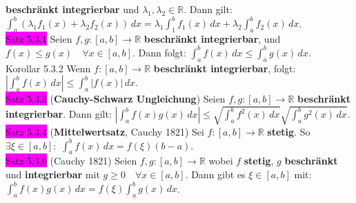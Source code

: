 \documentclass[landscape, 10pt]{article}
\newcommand{\R}{\mathbb{R}}
\begin{document}
\begin{multicols}{3}
                     \textbf{beschränkt 
                     integrierbar} und \textcolor{NavyBlue}{$\lambda_1,\lambda_2\in\R$}. 
                     Dann gilt: 
                     \textcolor{NavyBlue}{
                     $\int_a^b(\lambda_1f_1(x)+\lambda_2f_2(x))\,dx
                     =\lambda_1\int_1^bf_1(x)\,dx+\lambda_2\int_a^bf_2(x)\,dx$}.\\ 
              \colorbox{magenta}{Satz 5.3.1} 
                     Seien \textcolor{NavyBlue}{$f,g:[a,b]\longrightarrow\R$}
                     \textbf{beschränkt integrierbar}, und 
                     \textcolor{NavyBlue}{
                     $f(x)\leqslant g(x)\quad\forall x\in[a,b]$}.
                     Dann folgt: \textcolor{NavyBlue}{
                     $\int_a^bf(x)\,dx\leqslant\int_a^bg(x)\,dx$}. \\
              \colorbox{BurntOrange}{Korollar 5.3.2} 
                     Wenn \textcolor{NavyBlue}{$f:[a,b]\longrightarrow\R$} 
                     \textbf{beschränkt integrierbar}, folgt: 
                     \textcolor{NavyBlue}{
                     $|\int_a^bf(x)\,dx|\leqslant\int_a^b|f(x)|\,dx$}.\\
              \colorbox{magenta}{Satz 5.3.3} 
              (\textbf{Cauchy-Schwarz Ungleichung}) 
                     Seien \textcolor{NavyBlue}{$f,g:[a,b]\longrightarrow\R$}
                     \textbf{beschränkt integrierbar}. Dann gilt: 
                     \textcolor{NavyBlue}{$|\int_a^bf(x)g(x)\,dx|
                     \leqslant\sqrt{\int_a^bf^2(x)\,dx}
                     \sqrt{\int_a^bg^2(x)\,dx}$}.\\
              \colorbox{magenta}{Satz 5.3.4} 
              (\textbf{Mittelwertsatz}, Cauchy 1821) 
                     Sei \textcolor{NavyBlue}{$f:[a,b]\longrightarrow\R$} 
                     \textbf{stetig}. So 
                     \textcolor{NavyBlue}{$\exists\xi\in[a,b]$}:\, 
                     \textcolor{NavyBlue}{$\int_a^bf(x)\,dx=f(\xi)(b-a)$}.\\
              \colorbox{magenta}{Satz 5.3.6} (Cauchy 1821) Seien 
                     \textcolor{NavyBlue}{$f,g:[a,b]\longrightarrow\R$} wobei 
                     \textcolor{NavyBlue}{$f$} \textbf{stetig}, 
                     \textcolor{NavyBlue}{$g$} \textbf{beschränkt} und 
                     \textbf{integrierbar} mit 
                     \textcolor{NavyBlue}{$g\geqslant0\quad\forall x\in[a,b]$}. 
                     Dann gibt es \textcolor{NavyBlue}{$\xi\in[a,b]$} mit: 
                     \textcolor{NavyBlue}{
                     $\int_a^bf(x)g(x)\,dx=f(\xi)\int_a^bg(x)\,dx$}. \\

\end{multicols}
\end{document}
